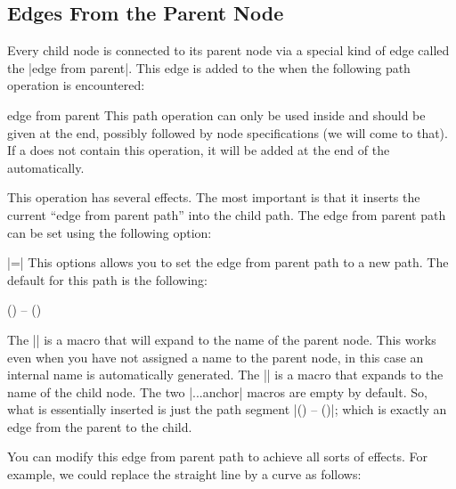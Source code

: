 \subsection{Edges From the Parent Node}

\label{section-edge-from-parent}

Every child node is connected to its parent node via a special kind of
edge called the |edge from parent|. This edge is added to the
 when the following path operation is encountered:

\begin{pathoperation}{edge from parent}{}
  This path operation can only be used inside  and
  should be given at the end, possibly followed by node specifications
  (we will come to that). If a  does not contain this
  operation, it will be added at the end of the 
  automatically.

  This operation has several effects. The most important is that it
  inserts the current ``edge from parent path'' into the child
  path. The edge from parent path can be set using the following
  option:
  \begin{itemize}
    |=|
    This options allows you to set the edge from parent path to a new
    path. The default for this path is the following:
    \begin{codeexample}
(\tikzparentnode\tikzparentanchor) -- (\tikzchildnode\tikzchildanchor)      
    \end{codeexample}
    The |\tikzparentnode| is a macro that will expand to the name of
    the parent node. This works even when you have not assigned a name
    to the parent node, in this case an internal name is automatically
    generated. The |\tikzchildnode| is a macro that expands to the
    name of the child node. The two |...anchor| macros are empty by
    default. So, what is essentially inserted is just the path segment
    |(\tikzparentnode) -- (\tikzchildnode)|; which is exactly an edge
    from the parent to the child.

    You can modify this edge from parent path to achieve all sorts of
    effects. For example, we could replace the straight line by a
    curve as follows:
\begin{codeexample}[]
\end{codeexample}


\end{itemize}
\end{pathoperation}
